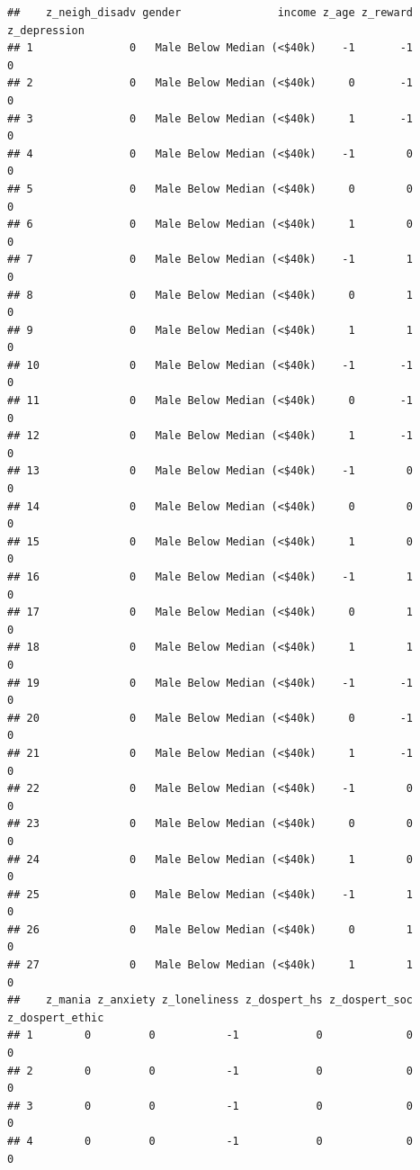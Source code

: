 \documentclass[
]{article}
\begin{document}
\begin{verbatim}
##    z_neigh_disadv gender               income z_age z_reward z_depression
## 1               0   Male Below Median (<$40k)    -1       -1            0
## 2               0   Male Below Median (<$40k)     0       -1            0
## 3               0   Male Below Median (<$40k)     1       -1            0
## 4               0   Male Below Median (<$40k)    -1        0            0
## 5               0   Male Below Median (<$40k)     0        0            0
## 6               0   Male Below Median (<$40k)     1        0            0
## 7               0   Male Below Median (<$40k)    -1        1            0
## 8               0   Male Below Median (<$40k)     0        1            0
## 9               0   Male Below Median (<$40k)     1        1            0
## 10              0   Male Below Median (<$40k)    -1       -1            0
## 11              0   Male Below Median (<$40k)     0       -1            0
## 12              0   Male Below Median (<$40k)     1       -1            0
## 13              0   Male Below Median (<$40k)    -1        0            0
## 14              0   Male Below Median (<$40k)     0        0            0
## 15              0   Male Below Median (<$40k)     1        0            0
## 16              0   Male Below Median (<$40k)    -1        1            0
## 17              0   Male Below Median (<$40k)     0        1            0
## 18              0   Male Below Median (<$40k)     1        1            0
## 19              0   Male Below Median (<$40k)    -1       -1            0
## 20              0   Male Below Median (<$40k)     0       -1            0
## 21              0   Male Below Median (<$40k)     1       -1            0
## 22              0   Male Below Median (<$40k)    -1        0            0
## 23              0   Male Below Median (<$40k)     0        0            0
## 24              0   Male Below Median (<$40k)     1        0            0
## 25              0   Male Below Median (<$40k)    -1        1            0
## 26              0   Male Below Median (<$40k)     0        1            0
## 27              0   Male Below Median (<$40k)     1        1            0
##    z_mania z_anxiety z_loneliness z_dospert_hs z_dospert_soc z_dospert_ethic
## 1        0         0           -1            0             0               0
## 2        0         0           -1            0             0               0
## 3        0         0           -1            0             0               0
## 4        0         0           -1            0             0               0

\end{verbatim}
\end{document}
